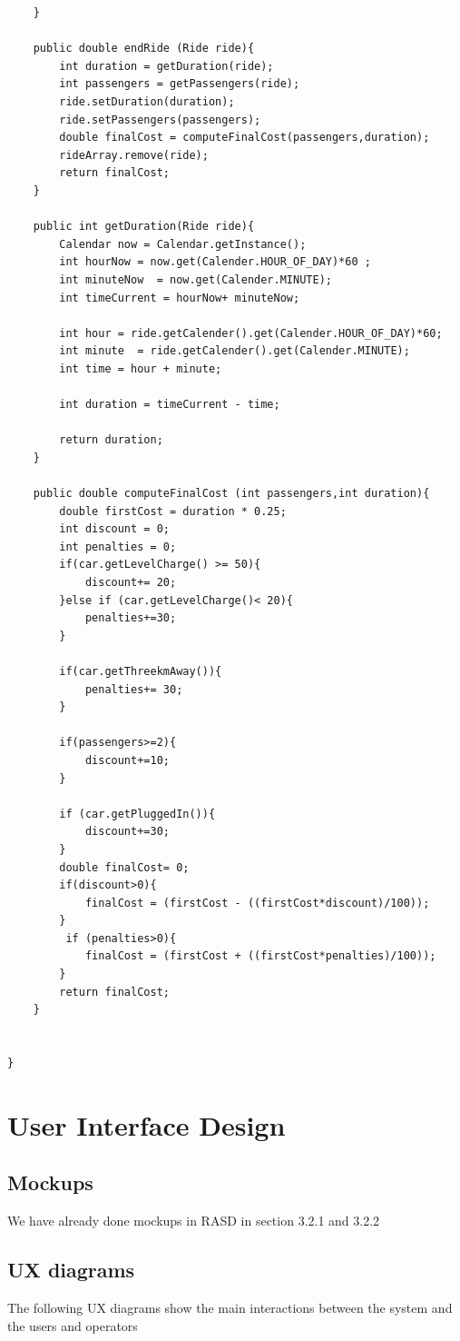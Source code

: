 \documentclass{article}
\begin{document}
\begin{flushleft}
\begin{lstlisting}
	}
	
	public double endRide (Ride ride){
		int duration = getDuration(ride);
		int passengers = getPassengers(ride);
		ride.setDuration(duration);
		ride.setPassengers(passengers);
		double finalCost = computeFinalCost(passengers,duration);
		rideArray.remove(ride);
		return finalCost;
	}
	
	public int getDuration(Ride ride){
		Calendar now = Calendar.getInstance();
		int hourNow = now.get(Calender.HOUR_OF_DAY)*60 ;
		int minuteNow  = now.get(Calender.MINUTE);
		int timeCurrent = hourNow+ minuteNow;
		
		int hour = ride.getCalender().get(Calender.HOUR_OF_DAY)*60;
		int minute  = ride.getCalender().get(Calender.MINUTE);
		int time = hour + minute;
		
		int duration = timeCurrent - time;
		
		return duration;
	}
	
	public double computeFinalCost (int passengers,int duration){
		double firstCost = duration * 0.25;
		int discount = 0;
		int penalties = 0;
		if(car.getLevelCharge() >= 50){
			discount+= 20;
		}else if (car.getLevelCharge()< 20){
			penalties+=30;
		}
		
		if(car.getThreekmAway()){
			penalties+= 30;
		}
		
		if(passengers>=2){
			discount+=10;
		}
		
		if (car.getPluggedIn()){
			discount+=30;
		}
		double finalCost= 0;
		if(discount>0){
			finalCost = (firstCost - ((firstCost*discount)/100));
		}
		 if (penalties>0){
			finalCost = (firstCost + ((firstCost*penalties)/100));
		}
		return finalCost;
	}
	
	
}
\end{lstlisting}

\section{User Interface Design} %
\subsection{Mockups}%
We have already done mockups in RASD in section 3.2.1 and 3.2.2\break
\newpage
\subsection{UX diagrams} %
The following UX diagrams show the main interactions between the system and the users and operators\break



\end{flushleft}
\end{document}
